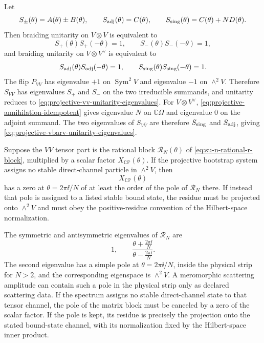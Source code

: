 Let
\begin{equation}
  S_\pm(\theta)=A(\theta)\pm B(\theta),\qquad
  S_{\rm adj}(\theta)=C(\theta),\qquad
  S_{\rm sing}(\theta)=C(\theta)+N D(\theta).
  \label{eq:projective-channel-eigenvalues}
\end{equation}
Then braiding unitarity on \(V\otimes V\) is equivalent to
\begin{equation}
  S_+(\theta)S_+(-\theta)=1,\qquad
  S_-(\theta)S_-(-\theta)=1,
  \label{eq:projective-vv-unitarity-eigenvalues}
\end{equation}
and braiding unitarity on \(V\otimes V^\vee\) is equivalent to
\begin{equation}
  S_{\rm adj}(\theta)S_{\rm adj}(-\theta)=1,\qquad
  S_{\rm sing}(\theta)S_{\rm sing}(-\theta)=1.
  \label{eq:projective-vbarv-unitarity-eigenvalues}
\end{equation}
The flip \(P_{VV}\) has eigenvalue \(+1\) on \(\operatorname{Sym}^2 V\) and
eigenvalue \(-1\) on \(\wedge^2 V\).  Therefore \(S_{VV}\) has eigenvalues
\(S_+\) and \(S_-\) on the two irreducible summands, and unitarity reduces to
\eqref{eq:projective-vv-unitarity-eigenvalues}.  For \(V\otimes V^\vee\),
\eqref{eq:projective-annihilation-idempotent} gives eigenvalue \(N\) on
\(\mathbb C\Omega\) and eigenvalue \(0\) on the adjoint summand.  The two
eigenvalues of \(S_{V\bar V}\) are therefore \(S_{\rm sing}\) and
\(S_{\rm adj}\), giving \eqref{eq:projective-vbarv-unitarity-eigenvalues}.

\begin{remark}
\label{rem:projective-pole-assignment-rule}
Suppose the \(VV\) tensor part is the rational block
\(\mathcal R_N(\theta)\) of \eqref{eq:su-n-rational-r-block}, multiplied by a
scalar factor \(X_{\mathbb{CP}}(\theta)\).  If the projective bootstrap system
assigns no stable direct-channel particle in \(\wedge^2 V\), then
\[
  X_{\mathbb{CP}}(\theta)
\]
has a zero at \(\theta=2\pi\ii/N\) of at least the order of the pole of
\(\mathcal R_N\) there.  If instead that pole is assigned to a listed stable
bound state, the residue must be projected onto \(\wedge^2 V\) and must obey
the positive-residue convention of the Hilbert-space normalization.
\end{remark}

The symmetric and antisymmetric eigenvalues of \(\mathcal R_N\) are
\[
  1,\qquad
  \frac{\theta+\frac{2\pi\ii}{N}}{\theta-\frac{2\pi\ii}{N}} .
\]
The second eigenvalue has a simple pole at \(\theta=2\pi\ii/N\), inside the
physical strip for \(N>2\), and the corresponding eigenspace is
\(\wedge^2V\).  A meromorphic scattering amplitude can contain such a pole in
the physical strip only as declared scattering data.  If the spectrum assigns
no stable direct-channel state to that tensor channel, the pole of the matrix
block must be canceled by a zero of the scalar factor.  If the pole is kept,
its residue is precisely the projection onto the stated bound-state channel,
with its normalization fixed by the Hilbert-space inner product.

